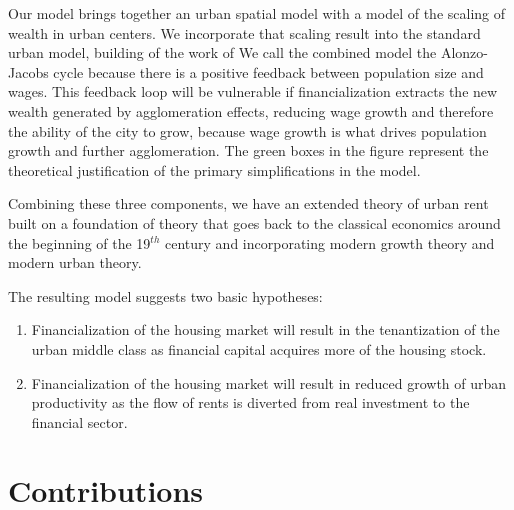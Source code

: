 Our model brings together an urban spatial model with a model of the scaling of wealth in urban centers. %
We incorporate that scaling result into the standard urban model, building of the work of %
We call the combined model the %
\gls{Alonzo-Jacobs cycle} because there is a positive feedback between population size and wages. This feedback loop will be vulnerable if financialization  extracts the new wealth generated by agglomeration effects, reducing wage growth and therefore the ability of the city to grow, because wage growth is what drives population growth and further agglomeration.
The green boxes in the figure represent the theoretical justification of the primary simplifications in the model. 

Combining these three components, we have an extended theory of urban rent built on a foundation of theory that goes back to the \gls{classical economics} around the beginning of the 19$^{th}$ century and incorporating modern growth theory and modern urban theory. 

The resulting model suggests two basic hypotheses:
\begin{enumerate}
    \item Financialization of the housing market will result in the tenantization of the urban middle class as financial capital acquires more of the housing stock. %
    \item Financialization of the housing market will result in reduced growth of urban productivity as the flow of rents is diverted from real investment to the financial sector.
\end{enumerate} 

\section{Contributions}

